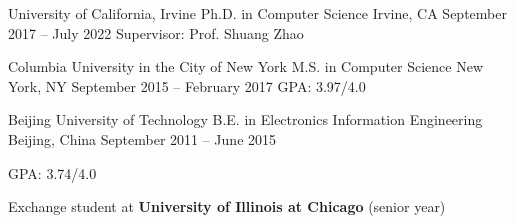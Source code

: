 
\begin{cventries}

  \cventry
    {University of California, Irvine}
    {Ph.D. in Computer Science}
    {Irvine, CA}
    {September 2017 -- July 2022}
    {Supervisor: Prof. Shuang Zhao}

  \cventry
    {Columbia University in the City of New York}
    {M.S. in Computer Science}
    {New York, NY}
    {September 2015 -- February 2017}
    {GPA: 3.97/4.0}

  \cventry
	{Beijing University of Technology}
	{B.E. in Electronics Information Engineering}
	{Beijing, China}
	{September 2011 -- June 2015}
	{   
		\begin{cvitems}
			\item{GPA: 3.74/4.0}
			\item{Exchange student at \textbf{University of Illinois at Chicago} (senior year)}
		\end{cvitems}
	}


\end{cventries}
